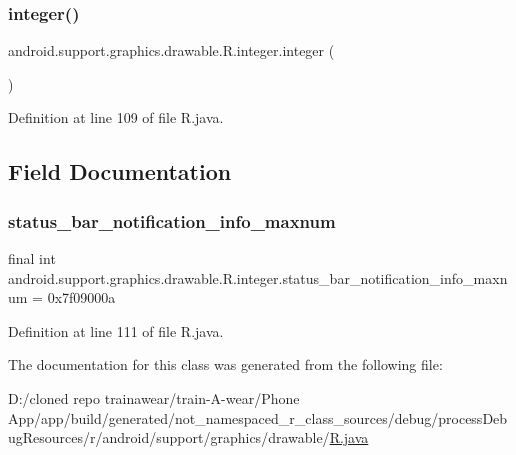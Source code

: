 \subsubsection{\texorpdfstring{integer()}{integer()}}
{\footnotesize\ttfamily android.\+support.\+graphics.\+drawable.\+R.\+integer.\+integer (\begin{DoxyParamCaption}{ }\end{DoxyParamCaption})\hspace{0.3cm}{\ttfamily [private]}}



Definition at line 109 of file R.\+java.


\begin{DoxyCode}{0}

\end{DoxyCode}


\subsection{Field Documentation}
\mbox{\label{classandroid_1_1support_1_1graphics_1_1drawable_1_1_r_1_1integer_a3940dbc80d681bc0c63c0e82e05868c6}} 
\subsubsection{\texorpdfstring{status\_bar\_notification\_info\_maxnum}{status\_bar\_notification\_info\_maxnum}}
{\footnotesize\ttfamily final int android.\+support.\+graphics.\+drawable.\+R.\+integer.\+status\+\_\+bar\+\_\+notification\+\_\+info\+\_\+maxnum = 0x7f09000a\hspace{0.3cm}{\ttfamily [static]}}



Definition at line 111 of file R.\+java.



The documentation for this class was generated from the following file\+:\begin{DoxyCompactItemize}
\item 
D\+:/cloned repo trainawear/train-\/\+A-\/wear/\+Phone App/app/build/generated/not\+\_\+namespaced\+\_\+r\+\_\+class\+\_\+sources/debug/process\+Debug\+Resources/r/android/support/graphics/drawable/\mbox{\hyperlink{process_debug_resources_2r_2android_2support_2graphics_2drawable_2_r_8java}{R.\+java}}\end{DoxyCompactItemize}
